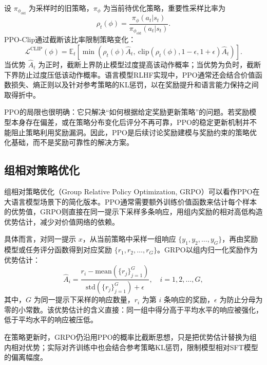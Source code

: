 设 $\pi_{\phi_{\text{old}}}$ 为采样时的旧策略，$\pi_\phi$ 为当前待优化策略，重要性采样比率为
\begin{equation}
    \rho_t(\phi) = \frac{\pi_\phi(a_t|s_t)}{\pi_{\phi_{\text{old}}}(a_t|s_t)}.
    \label{eq:importance_ratio}
\end{equation}
PPO-Clip通过截断该比率限制策略变化：
\begin{equation}
    \mathcal{L}^{\text{CLIP}}(\phi) = \mathbb{E}_t\left[\min\left(\rho_t(\phi) \hat{A}_t,\ \text{clip}(\rho_t(\phi), 1-\epsilon, 1+\epsilon) \hat{A}_t\right)\right].
    \label{eq:ppo_clip}
\end{equation}
当优势 $\hat{A}_t$ 为正时，截断上界防止模型过度提高该动作概率；当优势为负时，截断下界防止过度压低该动作概率。语言模型RLHF实现中，PPO通常还会结合价值函数损失、熵正则以及针对参考策略的KL惩罚，以在奖励提升和语言能力保持之间取得折中\cite{zheng2023secrets}。

PPO的局限也很明确：它只解决“如何根据给定奖励更新策略”的问题。若奖励模型本身存在偏差，或在策略分布变化后评分不再可靠，PPO的稳定更新机制并不能阻止策略利用奖励漏洞。因此，PPO是后续讨论奖励建模与奖励约束的策略优化基础，而不是奖励可靠性的解决方案。

\subsection{组相对策略优化}

组相对策略优化（Group Relative Policy Optimization, GRPO）\cite{shao2024deepseekmath}可以看作PPO在大语言模型场景下的简化版本。PPO通常需要额外训练价值函数来估计每个样本的优势值，GRPO则直接在同一提示下采样多条响应，用组内奖励的相对高低构造优势估计，减少对价值网络的依赖。

具体而言，对同一提示 $x$，从当前策略中采样一组响应 $\{y_1, y_2, \ldots, y_G\}$，再由奖励模型或任务评分函数得到对应奖励 $\{r_1, r_2, \ldots, r_G\}$。GRPO以组内归一化奖励作为优势估计：
\begin{equation}
    \hat{A}_i = \frac{r_i - \mathrm{mean}(\{r_j\}_{j=1}^{G})}{\mathrm{std}(\{r_j\}_{j=1}^{G}) + \epsilon}, \quad i=1,2,\ldots,G,
    \label{eq:grpo_advantage}
\end{equation}
其中，$G$ 为同一提示下采样的响应数量，$r_i$ 为第 $i$ 条响应的奖励，$\epsilon$ 为防止分母为零的小常数。该优势估计的含义直接：同一组中得分高于平均水平的响应被强化，低于平均水平的响应被压低。

在策略更新时，GRPO仍沿用PPO的概率比截断思想，只是把优势估计替换为组内相对优势；实际对齐训练中也会结合参考策略KL惩罚，限制模型相对SFT模型的偏离幅度。

